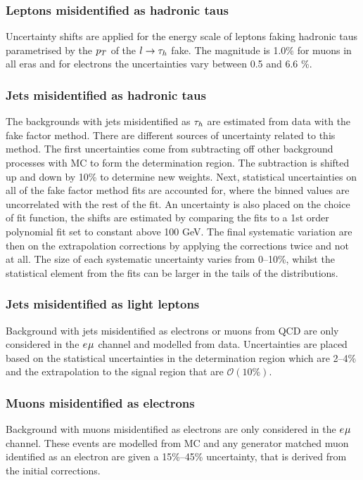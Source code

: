 \subsubsection{Leptons misidentified as hadronic taus}
Uncertainty shifts are applied for the energy scale of leptons faking hadronic taus parametrised by the $p_{T}$ of the $l \rightarrow\tau_{h}$ fake.
The magnitude is 1.0\% for muons in all eras and for electrons the uncertainties vary between 0.5 and 6.6 \%.

\subsubsection{Jets misidentified as hadronic taus}
The backgrounds with jets misidentified as $\tau_{h}$ are estimated from data with the fake factor method. 
There are different sources of uncertainty related to this method.
The first uncertainties come from subtracting off other background processes with MC to form the determination region. 
The subtraction is shifted up and down by 10\% to determine new weights.
Next, statistical uncertainties on all of the fake factor method fits are accounted for, where the binned values are uncorrelated with the rest of the fit.
An uncertainty is also placed on the choice of fit function, the shifts are estimated by comparing the fits to a 1st order polynomial fit set to constant above 100 GeV.
The final systematic variation are then on the extrapolation corrections by applying the corrections twice and not at all.
The size of each systematic uncertainty varies from 0--10\%, whilst the statistical element from the fits can be larger in the tails of the distributions.

\subsubsection{Jets misidentified as light leptons}
Background with jets misidentified as electrons or muons from QCD are only considered in the $e_{}\mu_{}$ channel and modelled from data.
Uncertainties are placed based on the statistical uncertainties in the determination region which are 2--4\% and the extrapolation to the signal region that are $\mathcal{O}(10\%)$.

\subsubsection{Muons misidentified as electrons}
Background with muons misidentified as electrons are only considered in the $e_{}\mu_{}$ channel.
These events are modelled from MC and any generator matched muon identified as an electron are given a 15\%--45\% uncertainty, that is derived from the initial corrections.

